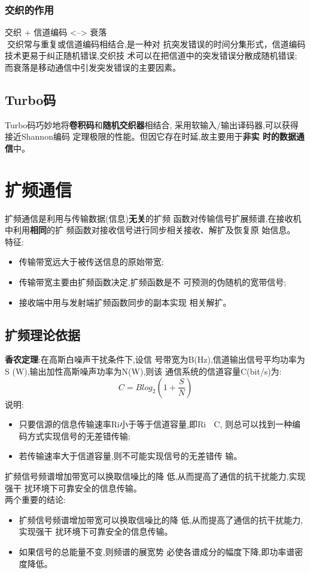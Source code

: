 \subsubsection{交织的作用}
交织 + 信道编码 <--> 衰落\\
\vspace{1cm}
交织常与重复或信道编码相结合,是一种对
抗突发错误的时间分集形式，信道编码技术更易于纠正随机错误,交织技
术可以在把信道中的突发错误分散成随机错误;
而衰落是移动通信中引发突发错误的主要因素。

\subsection{Turbo码}
Turbo码巧妙地将\textbf{卷积码}和\textbf{随机交织器}相结合,
采用软输入/输出译码器,可以获得接近Shannon编码
定理极限的性能。但因它存在时延,故主要用于\textbf{非实
时的数据通信}中。

\section{扩频通信}
扩频通信是利用与传输数据(信息)\textbf{无关}的扩频
函数对传输信号扩展频谱,在接收机中利用\textbf{相同}的扩
频函数对接收信号进行同步相关接收、解扩及恢复原
始信息。\\
特征:
\begin{itemize}
	\item 传输带宽远大于被传送信息的原始带宽;
	\item 传输带宽主要由扩频函数决定,扩频函数是不
	可预测的伪随机的宽带信号;
	\item 接收端中用与发射端扩频函数同步的副本实现
	相关解扩。
	
\end{itemize}
\subsection{扩频理论依据}
\textbf{香农定理}:在高斯白噪声干扰条件下,设信
号带宽为B(Hz),信道输出信号平均功率为S
(W),输出加性高斯噪声功率为N(W),则该
通信系统的信道容量C(bit/s)为:
\begin{equation}\label{key}
C = Blog_2(1+\frac{S}{N})
\end{equation}
说明:
\begin{itemize}
	\item 只要信源的信息传输速率Ri小于等于信道容量,即Ri  C,
	则总可以找到一种编码方式实现信号的无差错传输;
	\item 若传输速率大于信道容量,则不可能实现信号的无差错传
	输。
\end{itemize}
扩频信号频谱增加带宽可以换取信噪比的降
低,从而提高了通信的抗干扰能力,实现强干
扰环境下可靠安全的信息传输。\\
两个重要的结论:
\begin{itemize}
	\item 扩频信号频谱增加带宽可以换取信噪比的降
	低,从而提高了通信的抗干扰能力,实现强干
	扰环境下可靠安全的信息传输。
	\item 如果信号的总能量不变,则频谱的展宽势
	必使各谱成分的幅度下降,即功率谱密度降低。
	
\end{itemize}
